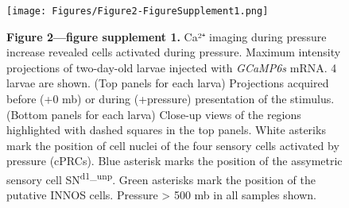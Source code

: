 \documentclass[
  11pt,
]{article}
\begin{document}
\begin{figure}[H]

{\centering \texttt{[image: Figures/Figure2-FigureSupplement1.png]}

}

\caption{\textbf{Figure 2---figure supplement 1.} Ca²⁺ imaging during
pressure increase revealed cells activated during pressure. Maximum
intensity projections of two-day-old larvae injected with \emph{GCaMP6s}
mRNA. 4 larvae are shown. (Top panels for each larva) Projections
acquired before (+0 mb) or during (+pressure) presentation of the
stimulus. (Bottom panels for each larva) Close-up views of the regions
highlighted with dashed squares in the top panels. White asteriks mark
the position of cell nuclei of the four sensory cells activated by
pressure (cPRCs). Blue asterisk marks the position of the assymetric
sensory cell SN\textsuperscript{d1\_unp}. Green asterisks mark the
position of the putative INNOS cells. Pressure \textgreater{} 500 mb in
all samples shown.}

\end{figure}%
\end{document}
